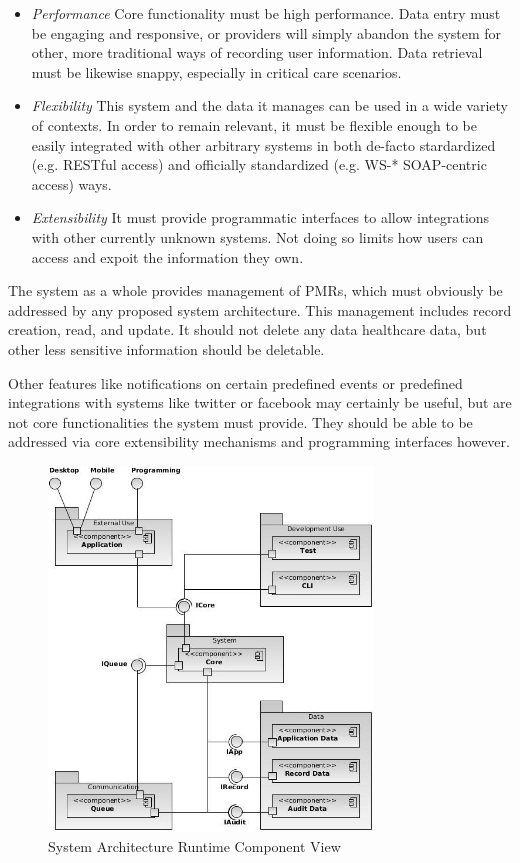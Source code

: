 \documentclass[10pt, conference, compsocconf]{IEEEtran}
\begin{document}
\begin{itemize}
\item \textit{Performance} Core functionality must be high performance.  Data entry must be engaging and responsive, or providers will simply abandon the system for other, more traditional ways of recording user information.  Data retrieval must be likewise snappy, especially in critical care scenarios.

\item \textit{Flexibility} This system and the data it manages can be used in a wide variety of contexts.  In order to remain relevant, it must be flexible enough to be easily integrated with other arbitrary systems in both de-facto stardardized (e.g. RESTful access) and officially standardized (e.g. WS-* SOAP-centric access) ways.

\item \textit{Extensibility} It must provide programmatic interfaces to allow integrations with other currently unknown systems.  Not doing so limits how users can access and expoit the information they own.

\end{itemize}

The system as a whole provides management of PMRs, which must obviously be addressed by any proposed system architecture.  This management includes record creation, read, and update. It should not delete any data healthcare data, but other less sensitive information should be deletable.

Other features like notifications on certain predefined events or predefined integrations with systems like twitter or facebook may certainly be useful, but are not core functionalities the system must provide.  They should be able to be addressed via core extensibility mechanisms and programming interfaces however.  

\begin{figure}[!t]
\centering
\includegraphics[width=3.4in]{HisbSystemArch}
\caption{System Architecture Runtime Component View}
\label{fig:RuntimeView}
\end{figure}
\end{document}
